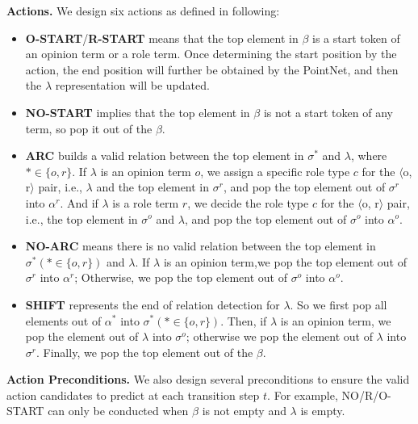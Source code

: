 \documentclass[letterpaper]{article} \usepackage{aaai22}  \usepackage{times}  \usepackage{helvet}  \usepackage{courier}  \usepackage[hyphens]{url}  \usepackage{graphicx} \urlstyle{rm} \def\UrlFont{\rm}  \usepackage{natbib}  \usepackage{caption} \DeclareCaptionStyle{ruled}{labelfont=normalfont,labelsep=colon,strut=off} \frenchspacing  \setlength{\pdfpagewidth}{8.5in}  \setlength{\pdfpageheight}{11in}  \usepackage{algorithm}
\begin{document}
\noindent\textbf{Actions.}
We design six actions as defined in following:
\begin{itemize}
\setlength{\topsep}{0pt}
\setlength{\itemsep}{0pt}
\setlength{\parsep}{0pt}
\setlength{\parskip}{0pt}
    \item \textbf{O-START}/\textbf{R-START} means that the top element in $\beta$ is a start token of an opinion term or a role term.
    Once determining the start position by the action, the end position will further be obtained by the PointNet,
    and then the $\lambda$ representation will be updated.

    \item \textbf{NO-START} implies that the top element in $\beta$ is not a start token of any term, so pop it out of the $\beta$.
      
    \item \textbf{ARC} builds a valid relation between the top element in $\sigma^*$ and $\lambda$, where $* \in \{o, r\}$.
    If $\lambda$ is an opinion term $o$, we assign a specific role type $c$ for the $\langle$o, r$\rangle$ pair, i.e., $\lambda$ and the top element in $\sigma^r$, and pop the top element out of $\sigma^r$ into $\alpha^r$.
    And if $\lambda$ is a role term $r$, we decide the role type $c$ for the $\langle$o, r$\rangle$ pair, i.e., the top element in $\sigma^o$ and $\lambda$, and pop the top element out of $\sigma^o$ into $\alpha^o$.

    \item \textbf{NO-ARC} means there is no valid relation between the top element in $\sigma^*(*\in\{o,r\})$ and $\lambda$.
    If $\lambda$ is an opinion term,we pop the top element out of $\sigma^r$ into $\alpha^r$; Otherwise, we pop the top element out of $\sigma^o$ into $\alpha^o$.

    \item \textbf{SHIFT} represents the end of relation detection for $\lambda$.
    So we first pop all elements out of $\alpha^*$ into $\sigma^*(* \in \{o, r\})$.
    Then, if $\lambda$ is an opinion term, we pop the element out of $\lambda$ into $\sigma^o$; otherwise we pop the element out of $\lambda$ into $\sigma^r$.
    Finally, we pop the top element out of the $\beta$.

\end{itemize}




\noindent\textbf{Action Preconditions.}
We also design several preconditions \cite{fan-etal-2020-transition} to ensure the valid action candidates to predict at each transition step $t$.
For example, NO/R/O-START can only be conducted when $\beta$ is not empty and $\lambda$ is empty.
\end{document}
